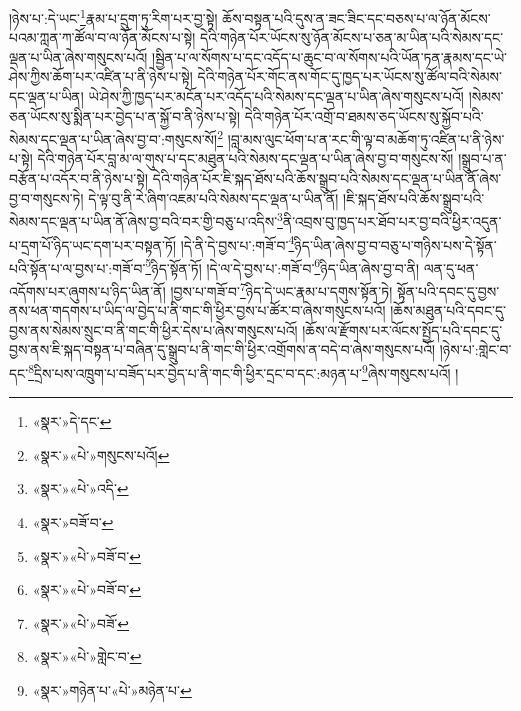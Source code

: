 །ཉེས་པ་:དེ་ཡང་\footnote{«སྣར་»དེ་དང་}རྣམ་པ་དྲུག་ཏུ་རིག་པར་བྱ་སྟེ། ཆོས་བསྟན་པའི་དུས་ན་ཟང་ཟིང་དང་བཅས་པ་ལ་ཉོན་མོངས་པའམ་ཀླན་ཀ་ཚོལ་བ་ལ་ཉོན་མོངས་པ་སྟེ། དེའི་གཉེན་པོར་ཡོངས་སུ་ཉོན་མོངས་པ་ཅན་མ་ཡིན་པའི་སེམས་དང་ལྡན་པ་ཡིན་ཞེས་གསུངས་པའོ། །སྦྱིན་པ་ལ་སོགས་པ་དང་འདོད་པ་ཆུང་བ་ལ་སོགས་པའི་ཡོན་ཏན་རྣམས་དང་ཡེ་ཤེས་ཀྱིས་ཆོག་པར་འཛིན་པ་ནི་ཉེས་པ་སྟེ། དེའི་གཉེན་པོར་གོང་ནས་གོང་དུ་ཁྱད་པར་ཡོངས་སུ་ཚོལ་བའི་སེམས་དང་ལྡན་པ་ཡིན། ཡེ་ཤེས་ཀྱི་ཁྱད་པར་མངོན་པར་འདོད་པའི་སེམས་དང་ལྡན་པ་ཡིན་ཞེས་གསུངས་པའོ། །སེམས་ཅན་ཡོངས་སུ་སྨིན་པར་བྱེད་པ་ན་སྐྱོ་བ་ནི་ཉེས་པ་སྟེ། དེའི་གཉེན་པོར་འགྲོ་བ་ཐམས་ཅད་ཡོངས་སུ་སྐྱོབ་པའི་སེམས་དང་ལྡན་པ་ཡིན་ཞེས་བྱ་བ་:གསུངས་སོ།\footnote{«སྣར་»«པེ་»གསུངས་པའོ།} །བླ་མས་ལུང་ཕོག་པ་ན་རང་གི་ལྟ་བ་མཆོག་ཏུ་འཛིན་པ་ནི་ཉེས་པ་སྟེ། དེའི་གཉེན་པོར་བླ་མ་ལ་གུས་པ་དང་མཐུན་པའི་སེམས་དང་ལྡན་པ་ཡིན་ཞེས་བྱ་བ་གསུངས་སོ། །སྒྲུབ་པ་ན་བརྩོན་པ་འདོར་བ་ནི་ཉེས་པ་སྟེ། དེའི་གཉེན་པོར་ཇི་སྐད་ཐོས་པའི་ཆོས་སྒྲུབ་པའི་སེམས་དང་ལྡན་པ་ཡིན་ནོ་ཞེས་བྱ་བ་གསུངས་ཏེ། དེ་ལྟ་བུ་ནི་རེ་ཞིག་འཇམ་པའི་སེམས་དང་ལྡན་པ་ཡིན་ནོ། །ཇི་སྐད་ཐོས་པའི་ཆོས་སྒྲུབ་པའི་སེམས་དང་ལྡན་པ་ཡིན་ནོ་ཞེས་བྱ་བའི་བར་གྱི་བཅུ་པ་འདིས་\footnote{«སྣར་»«པེ་»འདི་}ནི་འབྲས་བུ་ཁྱད་པར་ཐོབ་པར་བྱ་བའི་ཕྱིར་འདུན་པ་དྲག་པོ་ཉིད་ཡང་དག་པར་བསྟན་ཏོ། །དེ་ནི་དེ་བྱས་པ་:གཟོ་བ་\footnote{«སྣར་»བཟོ་བ་}ཉིད་ཡིན་ཞེས་བྱ་བ་བཅུ་པ་གཉིས་པས་དེ་སྟོན་པའི་སྟོན་པ་ལ་བྱས་པ་:གཟོ་བ་\footnote{«སྣར་»«པེ་»བཟོ་བ་}ཉིད་སྟོན་ཏོ། །དེ་ལ་དེ་བྱས་པ་:གཟོ་བ་\footnote{«སྣར་»«པེ་»བཟོ་བ་}ཉིད་ཡིན་ཞེས་བྱ་བ་ནི། ལན་དུ་ཕན་འདོགས་པར་ཞུགས་པ་ཉིད་ཡིན་ནོ། །བྱས་པ་གཟོ་བ་\footnote{«སྣར་»«པེ་»བཟོ་}ཉིད་དེ་ཡང་རྣམ་པ་དགུས་སྟོན་ཏེ། སྟོན་པའི་དབང་དུ་བྱས་ནས་ཕན་གདགས་པ་ཡིད་ལ་བྱེད་པ་ནི་གང་གི་ཕྱིར་བྱས་པ་ཚོར་བ་ཞེས་གསུངས་པའོ། །ཆོས་མཐུན་པའི་དབང་དུ་བྱས་ནས་སེམས་སྲུང་བ་ནི་གང་གི་ཕྱིར་དེས་པ་ཞེས་གསུངས་པའོ། །ཆོས་ལ་རྫོགས་པར་ལོངས་སྤྱོད་པའི་དབང་དུ་བྱས་ནས་ཇི་སྐད་བསྟན་པ་བཞིན་དུ་སྒྲུབ་པ་ནི་གང་གི་ཕྱིར་འགྲོགས་ན་བདེ་བ་ཞེས་གསུངས་པའོ། །ཉེས་པ་:གླེང་བ་དང་\footnote{«སྣར་»«པེ་»གླེང་བ་}དྲིས་པས་འཁྲུག་པ་བཟོད་པར་བྱེད་པ་ནི་གང་གི་ཕྱིར་དྲང་བ་དང་:མཉན་པ་\footnote{«སྣར་»གཉེན་པ་«པེ་»མཉེན་པ་}ཞེས་གསུངས་པའོ། །
